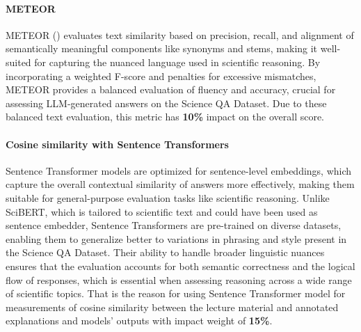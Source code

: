 \documentclass{article}
\begin{document}
\paragraph{METEOR}
METEOR (\cite{banerjee2005meteor}) evaluates text similarity based on precision, recall, and alignment of semantically meaningful components like synonyms and stems, making it well-suited for capturing the nuanced language used in scientific reasoning.
By incorporating a weighted F-score and penalties for excessive mismatches, METEOR provides a balanced evaluation of fluency and accuracy, crucial for assessing LLM-generated answers on the Science QA Dataset. Due to these balanced text evaluation, this metric has \textbf{10\%} impact on the overall score.

\paragraph{Cosine similarity with Sentence Transformers}
Sentence Transformer models are optimized for sentence-level embeddings, which capture the overall contextual similarity of answers more effectively, making them suitable for general-purpose evaluation tasks like scientific reasoning.
Unlike SciBERT, which is tailored to scientific text and could have been used as sentence embedder, Sentence Transformers are pre-trained on diverse datasets, enabling them to generalize better to variations in phrasing and style present in the Science QA Dataset.
Their ability to handle broader linguistic nuances ensures that the evaluation accounts for both semantic correctness and the logical flow of responses, which is essential when assessing reasoning across a wide range of scientific topics. That is the reason for using Sentence Transformer model for measurements of cosine similarity between the lecture material and annotated explanations and models' outputs with impact weight of \textbf{15\%}.
\end{document}
